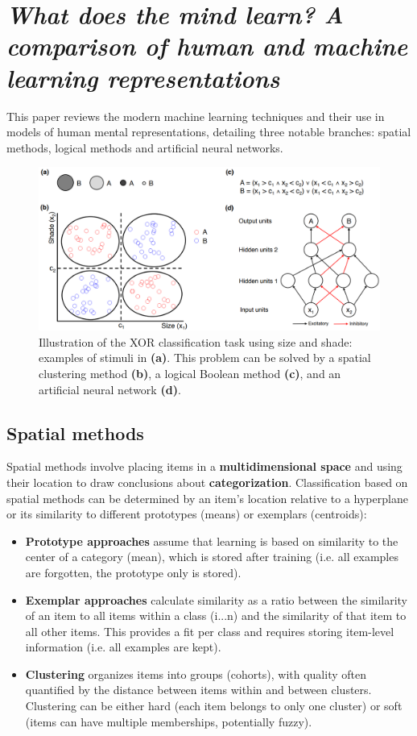 \section[Spatial methods, Logical methods and Artificial neural networks]{\textit{What does the mind learn? A comparison of human and machine learning representations}\\ \cite{SPICER201997}}

This paper reviews the modern machine learning techniques and their use in models of human mental representations, detailing three notable branches: spatial methods, logical methods and artificial neural networks.
\begin{figure}[ht]
    \centering
    \captionsetup{width=.8\linewidth}
    \includegraphics[width=0.75\linewidth]{images/xor.png}
    \caption{Illustration of the XOR classification task using size and shade: examples of stimuli in \textbf{(a)}. This problem can be solved by a spatial clustering method \textbf{(b)}, a logical Boolean method \textbf{(c)}, and an artificial neural network \textbf{(d)}.}
\end{figure}

\subsection{Spatial methods}
Spatial methods involve placing items in a \textbf{multidimensional space} and using their location to draw conclusions about \textbf{categorization}.
Classification based on spatial methods can be determined by an item's location relative to a hyperplane or its similarity to different prototypes (means) or exemplars (centroids):
\begin{itemize}
    \item \textbf{Prototype approaches} assume that learning is based on similarity to the center of a category (mean), which is stored after training (i.e. all examples are forgotten, the prototype only is stored).
    \item \textbf{Exemplar approaches} calculate similarity as a ratio between the similarity of an item to all items within a class (i...n) and the similarity of that item to all other items. This provides a fit per class and requires storing item-level information (i.e. all examples are kept).
    \item \textbf{Clustering} organizes items into groups (cohorts), with quality often quantified by the distance between items within and between clusters. Clustering can be either hard (each item belongs to only one cluster) or soft (items can have multiple memberships, potentially fuzzy).
\end{itemize}

